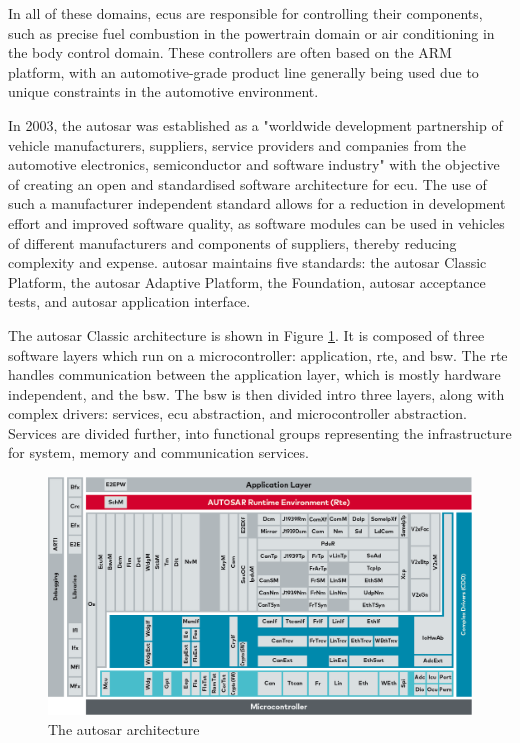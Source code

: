 In all of these domains, \glspl{ecu} are responsible for controlling their components, such as precise fuel combustion in the powertrain domain or air conditioning in the body control domain. These controllers are often based on the ARM platform, with an automotive-grade product line generally being used due to unique constraints in the automotive environment.\par

In 2003, the \gls{autosar} was established as a "worldwide development partnership of vehicle manufacturers, suppliers, service providers and companies from the automotive electronics, semiconductor and software industry" with the objective of creating an open and standardised software architecture for \gls{ecu}. The use of such a manufacturer independent standard allows for a reduction in development effort and improved software quality, as software modules can be used in vehicles of different manufacturers and components of suppliers, thereby reducing complexity and expense. \gls{autosar} maintains five standards: the \gls{autosar} Classic Platform, the \gls{autosar} Adaptive Platform, the Foundation, \gls{autosar} acceptance tests, and \gls{autosar} application interface.\par

The \gls{autosar} Classic architecture is shown in Figure \ref{fig:autosar_arch}. It is composed of three software layers which run on a microcontroller: application, \gls{rte}, and \gls{bsw}. The \gls{rte} handles communication between the application layer, which is mostly hardware independent, and the \gls{bsw}. The \gls{bsw} is then divided intro three layers, along with complex drivers: services, \gls{ecu} abstraction, and microcontroller abstraction. Services are divided further, into functional groups representing the infrastructure for system, memory and communication services.

\begin{figure}
    \centering
    \includegraphics[width = \linewidth]{img/parts/introduction/AUTOSAR.png}
    \caption{The \gls{autosar} architecture \citep{autosar_arch}}
    \label{fig:autosar_arch}
\end{figure}

